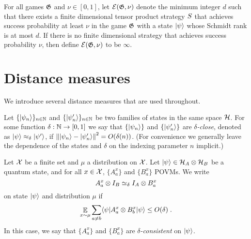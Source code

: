 \begin{definition}
  \label{def:ent}
	For all games $\mathfrak{G}$ and $\nu \in [0, 1]$, let $\mathcal{E}(\mathfrak{G}, \nu)$ denote the
  minimum integer $d$ such that there exists a finite dimensional tensor product
  strategy ${S}$ that achieves success probability at least $\nu$ in the
  game $\mathfrak{G}$ with a state $|\psi\rangle$ whose Schmidt rank is at most $d$.
  If there is no finite dimensional strategy that achieves success probability
  $\nu$, then define $\mathcal{E}(\mathfrak{G}, \nu)$ to be $\infty$.
\end{definition}

\section{Distance measures}

We introduce several distance measures that are used throughout.

\begin{definition}
  \label{def:state-distance}

	Let $\{|\psi_n\rangle\}_{n\in \mathbb{N}}$ and $\{|\psi'_n\rangle\}_{n\in \mathbb{N}}$ be two
  families of states in the same space $\mathcal{H}$.
  For some function $\delta : \mathbb{N} \to [0,1]$ we say that $\{ |\psi_n\rangle \}$ and
  $\{ |\psi'_n\rangle \}$ are \emph{$\delta$-close}, denoted as $|\psi\rangle
  \approx_\delta |\psi'\rangle$, if $ \left\| {|\psi_n\rangle - |\psi'_n\rangle} \right\|^2 =
  O(\delta(n))$.
  (For convenience we generally leave the dependence of the states and $\delta$
  on the indexing parameter $n$ implicit.)
\end{definition}

\begin{definition}
  \label{def:consistency}
	Let $\mathcal{X}$ be a finite set and $\mu$ a distribution on $\mathcal{X}$.
  Let $|\psi\rangle \in \mathcal{H}_A \otimes \mathcal{H}_B$ be a quantum state, and for
  all $x\in \mathcal{X}$, $\{A^x_a\}$ and $\{B^x_a\}$ POVMs.
  We write
  \begin{equation*}
    A^x_a \otimes I_B \simeq_\delta I_A \otimes B^x_a
  \end{equation*}
  on state $|\psi\rangle$ and distribution $\mu$ if
  \begin{equation*}
    \mathop{\mathbb{E}}\displaylimits_{x\sim \mu} \sum_{a\ne b} \langle\psi| A^x_a \otimes B^x_b |\psi\rangle
    \leq O(\delta)\;.
  \end{equation*}
  In this case, we say that $\{A^x_a\}$ and $\{B^x_a\}$ are
  \emph{$\delta$-consistent} on $|\psi\rangle$.
\end{definition}

